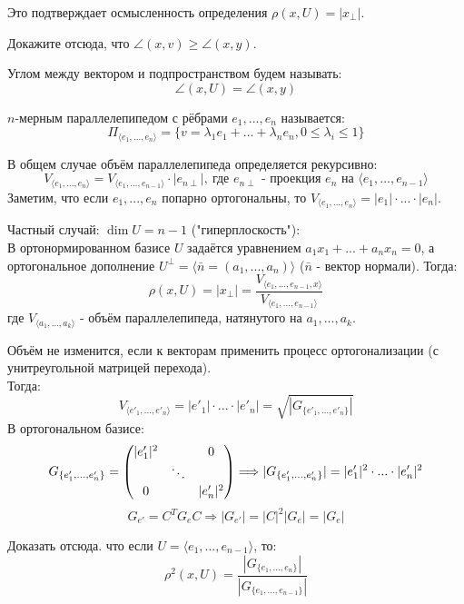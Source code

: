 Это подтверждает осмысленность определения $\rho(x, U) = |x_{\perp}|$.
\begin{exercise}
    Докажите отсюда, что $\angle(x, v) \geqslant \angle(x, y)$.
\end{exercise}
\begin{definition}
    Углом между вектором и подпространством будем называть: 
    $$\angle(x, U) = \angle(x, y)$$
\end{definition}

\begin{definition}
    $n$-мерным параллелепипедом с рёбрами $e_1,...,e_n$ называется:
    $$\Pi_{\langle e_1,...,e_n\rangle} = \{v = \lambda_1e_1 + ... + \lambda_{n}e_{n}, 0\leqslant\lambda_i\leqslant1\}$$
\end{definition}
\begin{definition}
    В общем случае объём параллелепипеда определяется рекурсивно:
    $$V_{\langle e_1,...,e_n\rangle} = V_{\langle e_1,...,e_{n-1}\rangle} \cdot |e_{n\perp}|,  \ \text{где $e_{n\perp}$ - проекция $e_n$ на $\langle e_1,...,e_{n-1}\rangle$}$$
    Заметим, что если $e_1,...,e_n$ попарно ортогональны, то $V_{\langle e_1,...,e_n\rangle} = |e_1|\cdot...\cdot|e_n|$.
\end{definition}
\begin{remark}
    Частный случай: $\dim U = n-1$ ("гиперплоскость"):\\
    В ортонормированном базисе $U$ задаётся уравнением $a_1x_1 +...+a_nx_n = 0$, а ортогональное дополнение $U^{\perp} = \langle \bar{n} = (a_1,...,a_n)\rangle$ ($\bar{n}$ - вектор нормали). Тогда:
    $$\rho(x, U) = |x_{\perp}| = \frac{V_{\langle e_1,...,e_{n-1},x\rangle}}{V_{\langle e_1,...,e_{n-1}\rangle}}$$
    где $V_{\langle a_1,...,a_k\rangle}$ - объём параллелепипеда, натянутого на $a_1,...,a_k$.
\end{remark} 
Объём не изменится, если к векторам применить процесс ортогонализации (с унитреугольной матрицей перехода).\\
Тогда: 
$$V_{\langle e'_1,...,e'_n\rangle} = |e'_1|\cdot...\cdot|e'_n| = \sqrt{|G_{\{ e'_1,...,e'_n\}}|}$$
В ортогональном базисе: 
$$G_{\{ e'_1,...,e'_n\}} = \begin{pmatrix} |e'_1|^2 &\null&0 \\ \null&\ddots&\null \\ 0&\null&|e'_n|^2 \end{pmatrix} \Longrightarrow  |G_{\{ e'_1,...,e'_n\}}| = |e'_1|^2\cdot...\cdot|e'_n|^2$$
$$G_{e'} = C^TG_eC \Longrightarrow |G_{e'}| = |C|^2|G_e| = |G_e|$$
\begin{exercise}
    Доказать отсюда. что если $U = \langle e_1,...,e_{n-1}\rangle$, то:
    $$\rho^2(x, U) = \frac{|G_{\{ e_1,...,e_n\}}|}{|G_{\{ e_1,...,e_{n-1}\}}|}$$
\end{exercise}
